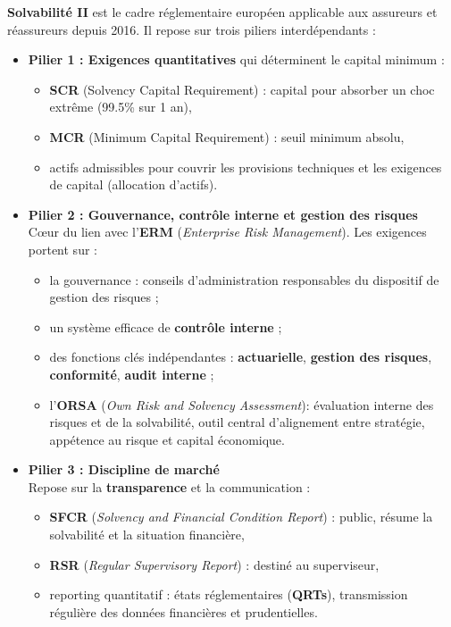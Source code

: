 	
\begin{f}
	
	\textbf{Solvabilité II} est le cadre réglementaire européen applicable aux assureurs et réassureurs depuis 2016. Il repose sur trois piliers interdépendants :
	
	\begin{itemize}
		\item \textbf{Pilier 1 : Exigences quantitatives}  qui déterminent le capital minimum :\\
		
		\begin{itemize}
			\item \textbf{SCR} (Solvency Capital Requirement) : capital pour absorber un choc extrême (99.5\% sur 1 an),
			\item \textbf{MCR} (Minimum Capital Requirement) : seuil minimum absolu,
			\item actifs admissibles pour couvrir les provisions techniques et les exigences de capital (allocation d'actifs).
		\end{itemize}
		
		\item \textbf{Pilier 2 : Gouvernance, contrôle interne et gestion des risques} \\
		Cœur du lien avec l'\textbf{ERM} (\emph{Enterprise Risk Management}). Les exigences portent sur :
		\begin{itemize}
			\item la gouvernance : conseils d'administration responsables du dispositif de gestion des risques ;
			\item un système efficace de \textbf{contrôle interne} ;
			\item des fonctions clés indépendantes : \textbf{actuarielle}, \textbf{gestion des risques}, \textbf{conformité}, \textbf{audit interne} ;
			\item l'\textbf{ORSA} (\emph{Own Risk and Solvency Assessment}): évaluation interne des risques et de la solvabilité, outil central d'alignement entre stratégie, appétence au risque et capital économique.
		\end{itemize}
		
		\item \textbf{Pilier 3 : Discipline de marché} \\
		Repose sur la \textbf{transparence} et la communication :
		\begin{itemize}
			\item \textbf{SFCR} (\emph{Solvency and Financial Condition Report}) : public, résume la solvabilité et la situation financière,
			\item \textbf{RSR} (\emph{Regular Supervisory Report}) : destiné au superviseur,
			\item reporting quantitatif : états réglementaires (\textbf{QRTs}), transmission régulière des données financières et prudentielles.
		\end{itemize}
	\end{itemize}
		
\end{f}
